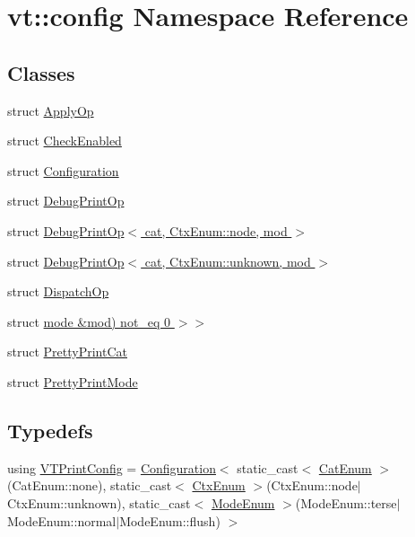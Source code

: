 \hypertarget{namespacevt_1_1config}{}\section{vt\+:\+:config Namespace Reference}
\label{namespacevt_1_1config}
\subsection*{Classes}
\begin{DoxyCompactItemize}
\item 
struct \hyperlink{structvt_1_1config_1_1_apply_op}{Apply\+Op}
\item 
struct \hyperlink{structvt_1_1config_1_1_check_enabled}{Check\+Enabled}
\item 
struct \hyperlink{structvt_1_1config_1_1_configuration}{Configuration}
\item 
struct \hyperlink{structvt_1_1config_1_1_debug_print_op}{Debug\+Print\+Op}
\item 
struct \hyperlink{structvt_1_1config_1_1_debug_print_op_3_01cat_00_01_ctx_enum_1_1node_00_01mod_01_4}{Debug\+Print\+Op$<$ cat, Ctx\+Enum\+::node, mod $>$}
\item 
struct \hyperlink{structvt_1_1config_1_1_debug_print_op_3_01cat_00_01_ctx_enum_1_1unknown_00_01mod_01_4}{Debug\+Print\+Op$<$ cat, Ctx\+Enum\+::unknown, mod $>$}
\item 
struct \hyperlink{structvt_1_1config_1_1_dispatch_op}{Dispatch\+Op}
\item 
struct \hyperlink{structvt_1_1config_1_1_check_enabled_3_01_op_00_01_c_00_01cat_00_01ctx_00_01mod_00_01typename_01d404ca8a687fcb080ca8b0942743aa40}{mode \&mod) not\+\_\+eq 0 $>$$>$}
\item 
struct \hyperlink{structvt_1_1config_1_1_pretty_print_cat}{Pretty\+Print\+Cat}
\item 
struct \hyperlink{structvt_1_1config_1_1_pretty_print_mode}{Pretty\+Print\+Mode}
\end{DoxyCompactItemize}
\subsection*{Typedefs}
\begin{DoxyCompactItemize}
\item 
using \hyperlink{namespacevt_1_1config_a2fcb16923fa0d26d60741f06f2933983}{V\+T\+Print\+Config} = \hyperlink{structvt_1_1config_1_1_configuration}{Configuration}$<$ static\+\_\+cast$<$ \hyperlink{namespacevt_1_1config_a6bd1d6215bda0d8ca02811798399f689}{Cat\+Enum} $>$(Cat\+Enum\+::none), static\+\_\+cast$<$ \hyperlink{namespacevt_1_1config_a46e57c33bee1b9f1fa95455af86d80e0}{Ctx\+Enum} $>$(Ctx\+Enum\+::node$\vert$Ctx\+Enum\+::unknown), static\+\_\+cast$<$ \hyperlink{namespacevt_1_1config_a724e99568632cc0fe9c456c2230270d0}{Mode\+Enum} $>$(Mode\+Enum\+::terse$\vert$Mode\+Enum\+::normal$\vert$Mode\+Enum\+::flush) $>$
\end{DoxyCompactItemize}
